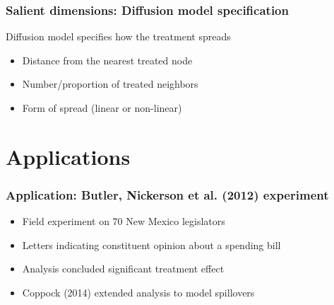 \documentclass{beamer}
\begin{document}
\begin{frame}
\frametitle{Salient dimensions: Diffusion model specification}
{\LARGE Diffusion model specifies how the treatment spreads}
\vspace{5mm}
\begin{itemize}
\item {\Large Distance from the nearest treated node}
\vspace{5mm}
\item {\Large Number/proportion of treated neighbors}
\vspace{5mm}
\item {\Large Form of spread (linear or non-linear)}
\end{itemize}
\end{frame}


\section{Applications}

\begin{frame}
\frametitle{Application: Butler, Nickerson et al. (2012) experiment}
\begin{itemize}
\item {\LARGE Field experiment on 70 New Mexico legislators}
\vspace{5mm}
\item {\LARGE Letters indicating constituent opinion about a spending bill}
\vspace{5mm}
\item {\LARGE Analysis concluded significant treatment effect}
\vspace{5mm}
\item {\LARGE Coppock (2014) extended analysis to model spillovers}
\end{itemize}
\end{frame}
\end{document}
